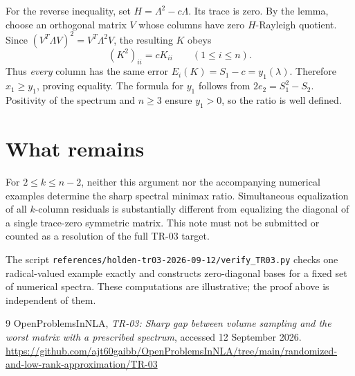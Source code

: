 \documentclass[11pt]{article}
\begin{document}
For the reverse inequality, set $H=\Lambda^2-c\Lambda$. Its trace is zero. By the lemma, choose an orthogonal matrix $V$ whose columns have zero $H$-Rayleigh quotient. Since $(V^T\Lambda V)^2=V^T\Lambda^2V$, the resulting $K$ obeys
\[
 (K^2)_{ii}=cK_{ii}\qquad(1\le i\le n).
\]
Thus \emph{every} column has the same error $E_i(K)=S_1-c=y_1(\lambda)$. Therefore $x_1\ge y_1$, proving equality. The formula for $y_1$ follows from $2e_2=S_1^2-S_2$. Positivity of the spectrum and $n\ge3$ ensure $y_1>0$, so the ratio is well defined.

\section{What remains}
For $2\le k\le n-2$, neither this argument nor the accompanying numerical examples determine the sharp spectral minimax ratio. Simultaneous equalization of all $k$-column residuals is substantially different from equalizing the diagonal of a single trace-zero symmetric matrix. This note must not be submitted or counted as a resolution of the full TR-03 target.

The script \texttt{references/holden-tr03-2026-09-12/verify\_TR03.py} checks one radical-valued example exactly and constructs zero-diagonal bases for a fixed set of numerical spectra. These computations are illustrative; the proof above is independent of them.

\begin{thebibliography}{9}
 OpenProblemsInNLA, \emph{TR-03: Sharp gap between volume sampling and the worst matrix with a prescribed spectrum}, accessed 12 September 2026.\\
\url{https://github.com/ajt60gaibb/OpenProblemsInNLA/tree/main/randomized-and-low-rank-approximation/TR-03}
\end{thebibliography}
\end{document}
